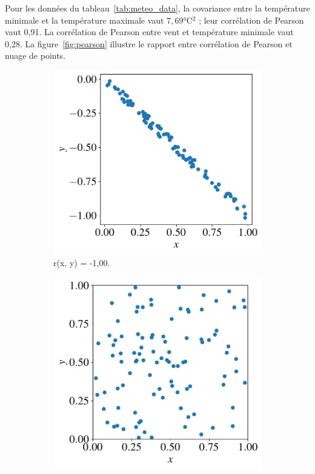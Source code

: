 \begin{exemple}
	Pour les données du tableau~\ref{tab:meteo_data}, la covariance entre la
	température minimale et la température maximale vaut $7,69 \si{\celsius^2}$ ;
	leur corrélation de Pearson vaut 0,91. La corrélation de Pearson entre vent
	et température minimale vaut 0,28. La figure~\ref{fig:pearson} illustre le
	rapport entre corrélation de Pearson et nuage de points.
\end{exemple}
\begin{figure}[h]
	\centering
	\begin{subfigure}[t]{0.24\textwidth}
		\centering
		\includegraphics[width=\textwidth]{figures/stats/pearson_3}
		\caption{r(x, y) = -1,00.}
	\end{subfigure} \hfill
	\begin{subfigure}[t]{0.24\textwidth}
		\centering
		\includegraphics[width=\textwidth]{figures/stats/pearson_0}

\end{subfigure}
\end{figure}

